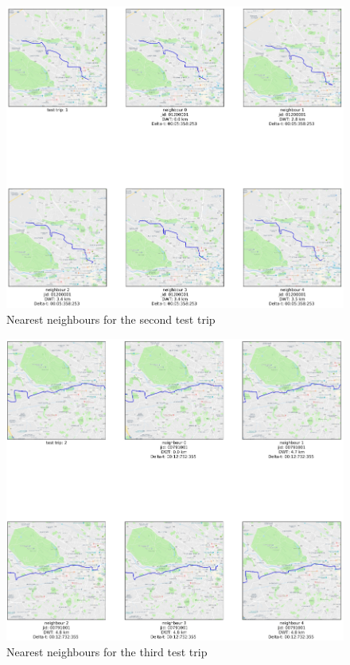 \documentclass[12pt]{article}
\begin{document}
	\begin{figure} [H]
		\begin{center}
			\includegraphics [scale = 0.60] {nn2.png}
			\caption{Nearest neighbours for the second test trip}
		\end{center}
	\end{figure}

	\begin{figure} [H]
		\begin{center}
			\includegraphics [scale = 0.60] {nn3.png}
			\caption{Nearest neighbours for the third test trip}
		\end{center}
	\end{figure} 
\end{document}
